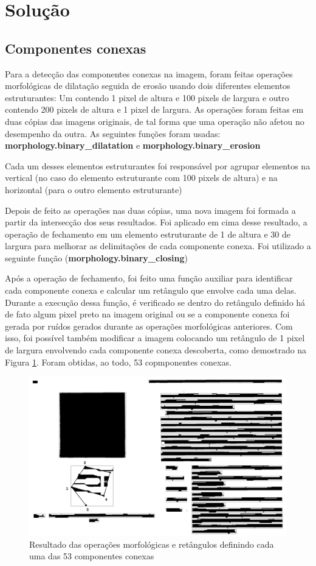 \documentclass{article}
\begin{document}
\section{Solução}

\subsection{Componentes conexas}

Para a detecção das componentes conexas na imagem, foram feitas operações morfológicas de dilatação seguida de erosão usando dois diferentes elementos estruturantes: Um contendo 1 pixel de altura e 100 pixels de largura e outro contendo 200 pixels de altura e 1 pixel de largura. As operações foram feitas em duas cópias das imagens originais, de tal forma que uma operação não afetou no desempenho da outra. As seguintes funções foram usadas: \textbf{morphology.binary\_dilatation} e \textbf{morphology.binary\_erosion}

Cada um desses elementos estruturantes foi responsável por agrupar elementos na vertical (no caso do elemento estruturante com 100 pixels de altura) e na horizontal (para o outro elemento estruturante)

Depois de feito as operações nas duas cópias, uma nova imagem foi formada a partir da intersecção dos seus resultados. Foi aplicado em cima desse resultado, a operação de fechamento em um elemento estruturante de 1 de altura e 30 de largura para melhorar as delimitações de cada componente conexa. Foi utilizado a seguinte função (\textbf{morphology.binary\_closing})

Após a operação de fechamento, foi feito uma função auxiliar para identificar cada componente conexa e calcular um retângulo que envolve cada uma delas. Durante a execução dessa função, é verificado se dentro do retângulo definido há de fato algum pixel preto na imagem original ou se a componente conexa foi gerada por ruídos gerados durante as operações morfológicas anteriores. Com isso, foi possível também modificar a imagem colocando um retângulo de 1 pixel de largura envolvendo cada componente conexa descoberta, como demostrado na Figura \ref{Fig:border_components}. Foram obtidas, ao todo, 53 copmponentes conexas.

\begin{figure}[!htb]
    \centering
    \includegraphics[width=.8\linewidth]{res/bitmap/img_border_components.png}
    \caption{Resultado das operações morfológicas e retângulos definindo cada uma das 53 componentes conexas}\label{Fig:border_components}
\end{figure}
\end{document}
